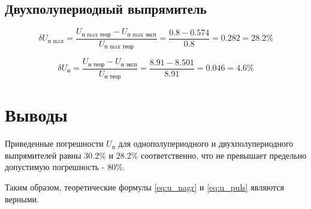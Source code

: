\documentclass[a4paper,14pt]{extarticle}
\begin{document}
\subsection{Двухполупериодный выпрямитель}

\[
\delta U_\text{п max} = \frac{U_\text{п max\ \ теор} - U_\text{п max\ \ эксп}}{U_\text{п max\ \ теор}} = \frac{0.8 - 0.574}{0.8} = 0.282 = 28.2 \%
\]

\[
\delta U_\text{н} = \frac{U_\text{н\ \ теор} - U_\text{н\ \ эксп}}{U_\text{н\ \ теор}} = \frac{8.91 - 8.501}{8.91} = 0.046 = 4.6 \%
\]

\section{Выводы}

Приведенные погрешности $U_\text{п}$ для однополупериодного и двухполупериодного выпрямителей равны 30.2\% и 28.2\% соответственно, что не превышает предельно допустимую погрешность - 80\%.

Таким образом, теоретические формулы \ref{eq:u_nagr} и \ref{eq:u_puls} являются верными.
\end{document}
